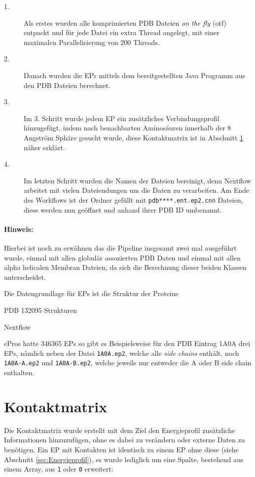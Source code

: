\begin{description}
\item[1.]
Als erstes wurden alle komprimierten PDB Dateien \emph{on the fly} (otf) entpackt und für jede Datei ein extra Thread angelegt, mit einer maximalen Parallelisierung von 200 Threads.
\item[2.] 
Danach wurden die EPs mittels dem bereitgestellten Java Programm aus den PDB Dateien berechnet.
\item[3.]
Im 3. Schritt wurde jedem EP ein zusätzliches Verbindungsprofil hinzugefügt, indem nach benachbarten Aminosäuren innerhalb der 8 Angström Sphäre gesucht wurde, diese Kontaktmatrix ist in Abschnitt \ref{sec:Kontaktmatrix} näher erklärt.
\item[4.]
Im letzten Schritt wurden die Namen der Dateien bereinigt, denn Nextflow arbeitet mit vielen Dateiendungen um die Daten zu verarbeiten. Am Ende des Workflows ist der Ordner gefüllt mit \texttt{pdb****.ent.ep2.cnn} Dateien, diese werden nun geöffnet und anhand ihrer PDB ID umbenannt.
\end{description}

\paragraph{Hinweis:} Hierbei ist noch zu erwähnen das die Pipeline insgesamt zwei mal ausgeführt wurde, einmal mit allen globulär assozierten PDB Daten und einmal mit allen alpha helicalen Membran Dateien, da sich die Berechnung dieser beiden Klassen unterscheidet.

Die Datengrundlage für EPs ist die Struktur der Proteine

PDB 132095 Strukturen

Nextflow

ePros hatte 346365 EPs
so gibt es Beispielsweise für den PDB Eintrag 1A0A drei EPs, nämlich neben der Datei \texttt{1A0A.ep2}, welche alle \emph{side chains} enthält, noch \texttt{1A0A-A.ep2} und \texttt{1A0A-B.ep2}, welche jeweils nur entweder die A oder B side chain enthalten.


\section{Kontaktmatrix}
\label{sec:Kontaktmatrix}
Die Kontaktmatrix wurde erstellt mit dem Ziel den Energieprofil zusätzliche Informationen hinzuzufügen, ohne es dabei zu verändern oder externe Daten zu benötigen. Ein EP mit Kontakten ist identisch zu einem EP ohne diese (siehe Abschnitt \ref{sec:Energieprofil}), es wurde lediglich um eine Spalte, bestehend aus einem Array, aus \texttt{1} oder \texttt{0} erweitert:

